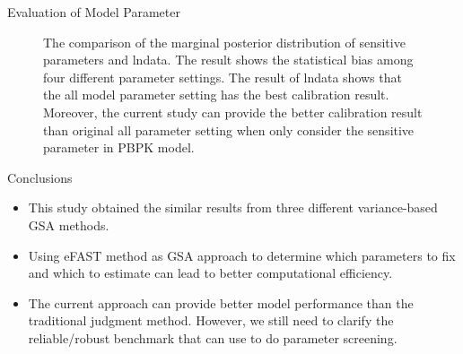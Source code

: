 \documentclass[xcolor=table]{beamer}
\begin{document}
\begin{frame}[t]
\begin{columns}[t]
\begin{column}{0.23\paperwidth}
\begin{block}{Evaluation of Model Parameter}
\begin{figure}
\caption{The comparison of the marginal posterior distribution of sensitive parameters and lndata. The result shows the statistical bias among four different parameter settings.
The result of lndata shows that the all model parameter setting has the best calibration result. 
Moreover, the current study can provide the better calibration result than original all parameter setting when only consider the sensitive parameter in PBPK model.
}
\end{figure}
\end{block}
\begin{alertblock}{Conclusions}
\begin{itemize}
\item This study obtained the similar results from three different variance-based GSA methods.
\item Using eFAST method as GSA approach to determine which parameters to fix and which to estimate can lead to better computational efficiency.
\item The current approach can provide better model performance than the traditional judgment method.
However, we still need to clarify the reliable/robust benchmark that can use to do parameter screening.
\end{itemize}
\end{alertblock}
%
%
\end{column} %


\end{columns}
\end{frame}
\end{document}
